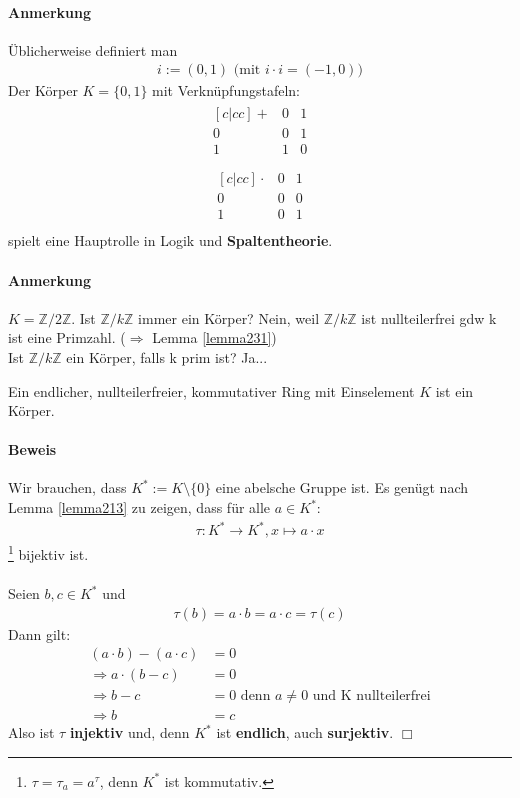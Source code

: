\documentclass[11pt]{report}
\newcommand*\Zb[1] {\mathbb{#1}}
\newcommand*\f[1] {\textbf{#1}}
\begin{document}
\paragraph{Anmerkung}
Üblicherweise definiert man
\begin{align}
 i := (0,1)\text{ (mit }i\cdot i = (-1, 0))
\end{align}
Der Körper $K=\{0,1\}$ mit Verknüpfungstafeln:
\begin{align}
 \begin{matrix}[c|cc]
 + & 0 & 1 \\
\hline
0 & 0 & 1 \\
1 & 1 & 0 \\
\end{matrix}
\end{align}
\begin{align}
 \begin{matrix}[c|cc]
 \cdot & 0 & 1 \\
\hline
0 & 0 & 0 \\
1 & 0 & 1 \\
\end{matrix}
\end{align}
spielt eine Hauptrolle in Logik und \f{Spaltentheorie}.

\paragraph{Anmerkung}
$K = \Zb{Z}/2\Zb{Z}$. Ist $\Zb{Z}/k\Zb{Z}$ immer ein Körper?
Nein, weil $\Zb{Z}/k\Zb{Z}$ ist nullteilerfrei gdw k ist eine Primzahl.
($\Rightarrow$ Lemma \ref{lemma231})\\
Ist $\Zb{Z}/k\Zb{Z}$ ein Körper, falls k prim ist? Ja...

\begin{lemma}
 \label{lemma232}
Ein endlicher, nullteilerfreier, kommutativer Ring mit Einselement $K$ ist ein Körper.
\end{lemma}
\paragraph{Beweis}
Wir brauchen, dass $K^{*} := K\setminus\{0\}$ eine abelsche Gruppe ist. Es genügt nach Lemma \ref{lemma213} zu zeigen, dass für alle $a\in K^{*}$:
\begin{align}
 \tau: K^{*} \rightarrow K^{*}, x \mapsto a\cdot x
\end{align}
\footnote{$\tau = \tau_a = a^{\tau}$, denn $K^{*}$ ist kommutativ.}
bijektiv ist.\\\\
Seien $b,c \in K^{*}$ und
\begin{align}
 \tau(b) = a \cdot b = a \cdot c = \tau(c)
\end{align}
Dann gilt:
\begin{align}
 (a\cdot b)-(a \cdot c) &= 0 \\
\Rightarrow a\cdot(b-c) &= 0 \\
\Rightarrow b-c &= 0 \textrm{ denn } a\neq 0 \text{ und K nullteilerfrei}\\
\Rightarrow b &= c
\end{align}
Also ist $\tau$ \f{injektiv} und, denn $K^{*}$ ist \f{endlich}, auch \f{surjektiv}. \hfill $\Box$
\end{document}
